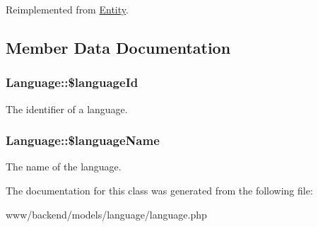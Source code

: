 Reimplemented from \hyperlink{classEntity_a8305fd94740ac62cbafb9de76567ce37}{Entity}.



\subsection{Member Data Documentation}
\hypertarget{classLanguage_a3074b0c6617cb91c7e31ccb3faf33908}{
\subsubsection[{\$languageId}]{\setlength{\rightskip}{0pt plus 5cm}Language::\$languageId}}
\label{classLanguage_a3074b0c6617cb91c7e31ccb3faf33908}
The identifier of a language. \hypertarget{classLanguage_a668d1ca7b67b40b4f8d001e2e1480dc3}{
\subsubsection[{\$languageName}]{\setlength{\rightskip}{0pt plus 5cm}Language::\$languageName}}
\label{classLanguage_a668d1ca7b67b40b4f8d001e2e1480dc3}
The name of the language. 

The documentation for this class was generated from the following file:\begin{DoxyCompactItemize}
\item 
www/backend/models/language/language.php\end{DoxyCompactItemize}
